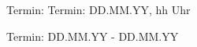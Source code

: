 \documentclass[final]{multiversum}
\begin{document}
\begin{termine}
\item Termin: Termin: DD.MM.YY, hh Uhr
  \item Termin: DD.MM.YY - DD.MM.YY
\end{termine}
\impressum
\end{document}
